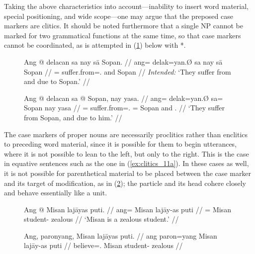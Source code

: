 
Taking the above characteristics into account---inability to insert word
material, special positioning, and wide scope---one may argue that the preposed
case markers are clitics. It should be noted furthermore that a single NP
cannot be marked for two grammatical functions at the same time, so that case
markers cannot be coordinated, as is attempted in (\ref{ex:precasecoord}) below
with *.

\begin{figure}[h]
\pex
\a\label{ex:precasecoord}\ljudge*\begingl
	\gla Ang @ delacan sa nay sā Sopan. //
	\glb ang= delak=yan.Ø sa nay sā Sopan //
	\glc \AgtT{}= suffer.from=\TplM{}.\Top{} \Parg{} and \Caus{} Sopan //
	\glft \textit{Intended:} `They suffer from and due to Sopan.' //
\endgl

\a\begingl
	\gla Ang @ delacan sa @ Sopan, nay yasa. //
	\glb ang= delak=yan.Ø sa= Sopan nay yasa //
	\glc \AgtT{}= suffer.from=\TplM{}.\Top{} \Parg{}= Sopan and 
		\TsgM{}.\Caus{} //
	\glft `They suffer from Sopan, and due to him.' //
	\endgl
\xe
\end{figure}

The case markers of proper nouns are necessarily proclitics rather than
enclitics to preceding word material, since it is possible for them to begin
utterances, where it is not possible to lean to the left, but only to the 
right. This is the case in equative sentences such as the one in 
(\ref{ex:clitics_11a}). In these cases as well, it is not possible for
parenthetical material to be placed between the case marker and its target of
modification, as in (\ref{ex:clitics_11b}); the particle and its head cohere
closely and behave essentially like a unit.

\begin{figure}[h]
\pex\label{ex:clitics_11}
\a\label{ex:clitics_11a}\begingl
	\gla Ang @ Misan lajāyas puti. //
	\glb ang= Misan lajāy-as puti //
	\glc \Aarg{}= Misan student-\Parg{} zealous //
	\glft `Misan is a zealous student.' //
\endgl

\a\label{ex:clitics_11b}\ljudge{*}\begingl
	\gla Ang, paronyang, Misan lajāyas puti. //
	\glb ang paron=yang Misan lajāy-as puti //
	\glc \Aarg{} believe=\Fsg{}.\Aarg{} Misan student-\Parg{} zealous //
\endgl
\xe
\end{figure}

